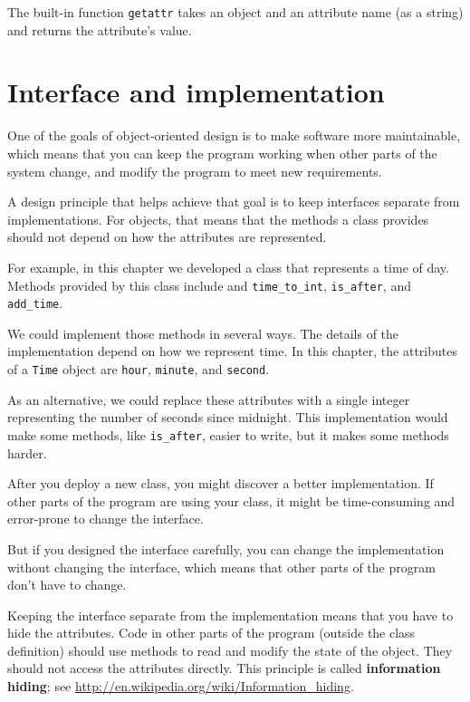 \documentclass[10pt]{book}
\begin{document}
\begin{CJK}{UTF8}{gbsn}
The built-in function {\tt getattr} takes an object and an attribute
name (as a string) and returns the attribute's value.


\section{Interface and implementation}

One of the goals of object-oriented design is to make software more
maintainable, which means that you can keep the program working when
other parts of the system change, and modify the program to meet new
requirements.

A design principle that helps achieve that goal is to keep
interfaces separate from implementations.  For objects, that means
that the methods a class provides should not depend on how the
attributes are represented.

For example, in this chapter we developed a class that represents
a time of day.  Methods provided by this class include
and \verb"time_to_int", \verb"is_after", and \verb"add_time".

We could implement those methods in several ways.  The details of the
implementation depend on how we represent time.  In this chapter, the
attributes of a {\tt Time} object are {\tt hour}, {\tt minute}, and
{\tt second}.

As an alternative, we could replace these attributes with
a single integer representing the number of seconds
since midnight.  This implementation would make some methods,
like \verb"is_after", easier to write, but it makes some methods
harder.

After you deploy a new class, you might discover a better
implementation.  If other parts of the program are using your
class, it might be time-consuming and error-prone to change the
interface.  

But if you designed the interface carefully, you can
change the implementation without changing the interface, which
means that other parts of the program don't have to change.

Keeping the interface separate from the implementation means that
you have to hide the attributes.  Code in other parts of the program
(outside the class definition) should use methods to read
and modify the state of the object.  They should not access the
attributes directly.  This principle is called {\bf information hiding};
see \url{http://en.wikipedia.org/wiki/Information_hiding}.


\end{CJK}
\end{document}
